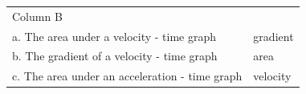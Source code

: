 \begin{enumerate}[noitemsep, label=\textbf{\arabic*}. ]
{\begin{center}
\begin{xtabular*}{\mytablewidth}[t]{|p{10\mystarwidth}|p{10\mystarwidth}|}
        Column B%
     \tabularnewline{}
    
    
        a. The area under a velocity - time graph &
    
    
        gradient%
     \tabularnewline{}
    
    
        b. The gradient of a velocity - time graph &
    
    
        area%
     \tabularnewline{}
    
    
        c. The area under an acceleration - time graph &
    
    
        velocity%
     \tabularnewline{}
    

\end{xtabular*}
\end{center}}
\end{enumerate}
